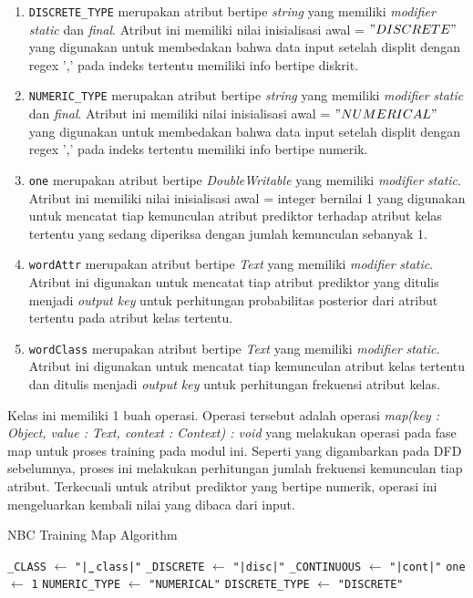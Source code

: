 \begin{enumerate}
\begin{enumerate}
		\item \verb|DISCRETE_TYPE| merupakan atribut bertipe \textit{string} yang memiliki \textit{modifier} \textit{static} dan \textit{final}. Atribut ini memiliki nilai inisialisasi awal = $"DISCRETE"$ yang digunakan untuk membedakan bahwa data input setelah displit dengan regex ',' pada indeks tertentu memiliki info bertipe diskrit.
		\item \verb|NUMERIC_TYPE| merupakan atribut bertipe \textit{string} yang memiliki \textit{modifier} \textit{static} dan \textit{final}. Atribut ini memiliki nilai inisialisasi awal = $"NUMERICAL"$ yang digunakan untuk membedakan bahwa data input setelah displit dengan regex ',' pada indeks tertentu memiliki info bertipe numerik.
		\item \verb|one| merupakan atribut bertipe \textit{DoubleWritable} yang memiliki \textit{modifier} \textit{static}. Atribut ini memiliki nilai inisialisasi awal = integer bernilai 1 yang digunakan untuk mencatat tiap kemunculan atribut prediktor terhadap atribut kelas tertentu yang sedang diperiksa dengan jumlah kemunculan sebanyak 1.
		\item \verb|wordAttr| merupakan atribut bertipe \textit{Text} yang memiliki \textit{modifier} \textit{static}. Atribut ini digunakan untuk mencatat tiap atribut prediktor yang ditulis menjadi \textit{output key} untuk perhitungan probabilitas posterior dari atribut tertentu pada atribut kelas tertentu.
		\item \verb|wordClass| merupakan atribut bertipe \textit{Text} yang memiliki \textit{modifier} \textit{static}. Atribut ini digunakan untuk mencatat tiap kemunculan atribut kelas tertentu dan ditulis menjadi \textit{output key} untuk perhitungan frekuensi atribut kelas.
	\end{enumerate}
	Kelas ini memiliki 1 buah operasi. Operasi tersebut adalah operasi \textit{map(key : Object, value : Text, context : Context) : void} yang melakukan operasi pada fase map untuk proses training pada modul ini. Seperti yang digambarkan pada DFD sebelumnya, proses ini melakukan perhitungan jumlah frekuensi kemunculan tiap atribut. Terkecuali untuk atribut prediktor yang bertipe numerik, operasi ini mengeluarkan kembali nilai yang dibaca dari input.
	
\begin{algorithm}[H]
\caption{NBC Training Map Algorithm}\label{alg:NBCGenMap}
\begin{algorithmic}[1]
\State \verb|_|\texttt{CLASS} $\gets$ \texttt{"|}$\verb|_|$\texttt{class|"}
\State \verb|_|\texttt{DISCRETE} $\gets$ \texttt{"|disc|"}
\State \verb|_|\texttt{CONTINUOUS} $\gets$ \texttt{"|cont|"}
\State \texttt{one} $\gets$ \texttt{1}
\State \texttt{NUMERIC}\verb|_|\texttt{TYPE} $\gets$ \texttt{"NUMERICAL"}
\State \texttt{DISCRETE}\verb|_|\texttt{TYPE} $\gets$ \texttt{"DISCRETE"}


\end{algorithmic}
\end{algorithm}
\end{enumerate}
